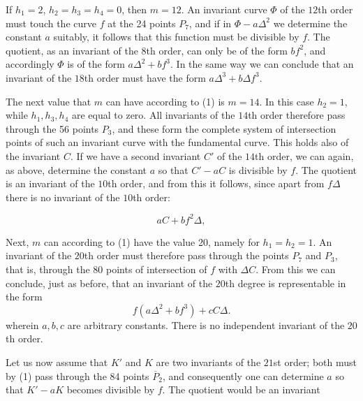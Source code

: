 If $h_1 = 2$, $h_2 = h_3 = h_4 = 0$, then $m = 12$. An
invariant curve $\Phi$ of the $12$th order must touch the curve $f$ at
the 24 points $P_7$, and if in $\Phi - a\Delta^2$ we determine the
constant $a$ suitably, it follows that this function
must be divisible by $f$. The quotient, as an invariant
of the $8$th order, can only be of the form $bf^2$, and accordingly
$\Phi$ is of the form $a\Delta^2 + bf^3$. In the same way we can conclude
that an invariant of the $18$th order must have the form
$a\Delta^3 + b\Delta f^3$.

\begin{center}
\end{center}

The next value that $m$ can have according to (1) is $m = 14$. In
this case $h_2 = 1$, while $h_1, h_3, h_4$ are equal to zero.
All invariants of the $14$th order therefore pass through the 56
points $P_3$, and these form the complete system of intersection points
of such an invariant curve with the fundamental curve. This holds also of
the invariant $C$. If we have a second invariant $C'$ of the $14$th
order, we can again, as above, determine the constant $a$ so
that $C' - aC$ is divisible by $f$. The quotient is
an invariant of the $10$th order, and from this it follows, since apart
from $f\Delta$ there is no invariant of the $10$th order:

\begin{center}
\end{center}
\[
aC + bf^2\Delta,
\]
\begin{center}
\end{center}

Next, $m$ can according to (1) have the value 20, namely for
$h_1 = h_2 = 1$. An invariant of the $20$th order must therefore pass
through the points $P_7$ and $P_3$, that is, through the 80
points of intersection of $f$ with $\Delta C$. From this we can conclude, just as
before, that an invariant of the $20$th degree is representable in
the form
\[
f(a\Delta^2 + bf^3) + cC\Delta.
\]
wherein $a, b, c$ are arbitrary constants. There is no
independent invariant of the $20$th order.

Let us now assume that $K'$ and $K$ are two invariants
of the $21$st order; both must by (1) pass through the 84 points
$\overline{P}_2$, and consequently one can determine $a$ so that
$K' - aK$ becomes divisible by $f$. The quotient would be an invariant
